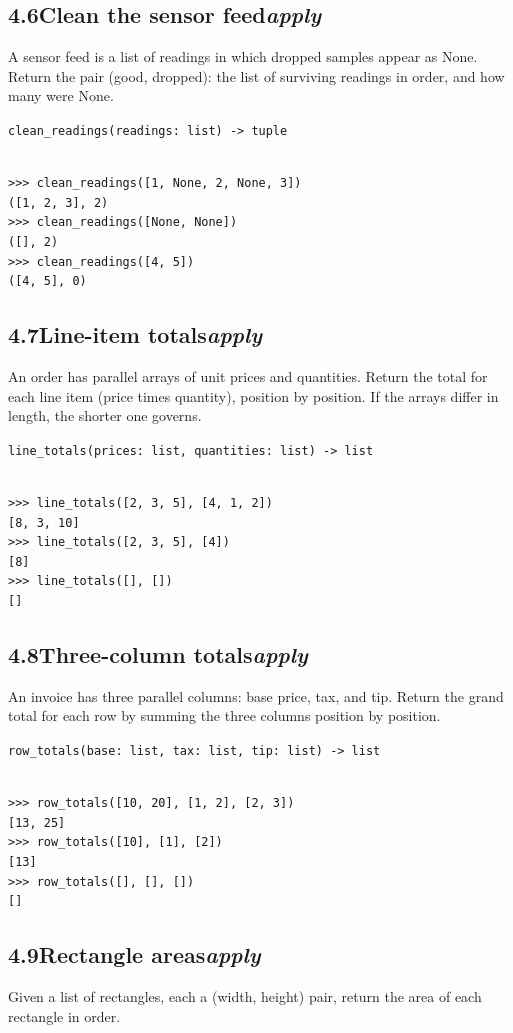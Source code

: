 \documentclass[10pt,letterpaper]{book}
\begin{document}
\subsection*{4.6\quad Clean the sensor feed\hfill\textnormal{\textit{apply}}}
A sensor feed is a list of readings in which dropped samples appear as None. Return the pair (good, dropped): the list of surviving readings in order, and how many were None.

\noindent\texttt{clean\_readings(readings: list) -> tuple}
\begin{lstlisting}[style=ex]

>>> clean_readings([1, None, 2, None, 3])
([1, 2, 3], 2)
>>> clean_readings([None, None])
([], 2)
>>> clean_readings([4, 5])
([4, 5], 0)

\end{lstlisting}
\subsection*{4.7\quad Line-item totals\hfill\textnormal{\textit{apply}}}
An order has parallel arrays of unit prices and quantities. Return the total for each line item (price times quantity), position by position. If the arrays differ in length, the shorter one governs.

\noindent\texttt{line\_totals(prices: list, quantities: list) -> list}
\begin{lstlisting}[style=ex]

>>> line_totals([2, 3, 5], [4, 1, 2])
[8, 3, 10]
>>> line_totals([2, 3, 5], [4])
[8]
>>> line_totals([], [])
[]

\end{lstlisting}
\subsection*{4.8\quad Three-column totals\hfill\textnormal{\textit{apply}}}
An invoice has three parallel columns: base price, tax, and tip. Return the grand total for each row by summing the three columns position by position.

\noindent\texttt{row\_totals(base: list, tax: list, tip: list) -> list}
\begin{lstlisting}[style=ex]

>>> row_totals([10, 20], [1, 2], [2, 3])
[13, 25]
>>> row_totals([10], [1], [2])
[13]
>>> row_totals([], [], [])
[]

\end{lstlisting}
\subsection*{4.9\quad Rectangle areas\hfill\textnormal{\textit{apply}}}
Given a list of rectangles, each a (width, height) pair, return the area of each rectangle in order.
\end{document}
